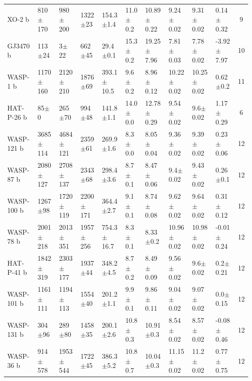 \begin{subappendices}
{\begin{landscape}
\begin{longtable}{llllllllllc}
  XO-2 b        &     810$\pm$170 &     980$\pm$200 &   1322$\pm$23 &    154.3$\pm$1.4 &  11.0$\pm$0.2 &  10.89$\pm$0.22 &   9.24$\pm$0.02 &   9.31$\pm$0.02 &   0.14$\pm$0.32 &        9 \\
  GJ3470 b     &      113$\pm$24 &        3$\pm$22 &    662$\pm$45 &     29.4$\pm$0.1 &  15.3$\pm$0.2 &  19.25$\pm$7.96 &   7.81$\pm$0.03 &   7.78$\pm$0.02 &  -3.92$\pm$7.97 &       10 \\
  WASP-1 b      &    1170$\pm$160 &    2120$\pm$210 &   1876$\pm$69 &   393.1$\pm$10.5 &   9.6$\pm$0.2 &   8.96$\pm$0.12 &  10.22$\pm$0.02 &  10.25$\pm$0.02 &    0.62$\pm$0.2 &       11 \\
  HAT-P-26 b     &        85$\pm$0 &      265$\pm$70 &    994$\pm$48 &    141.8$\pm$1.1 &  14.0$\pm$0.0 &  12.78$\pm$0.29 &   9.54$\pm$0.02 &    9.6$\pm$0.02 &   1.17$\pm$0.29 &        6 \\
  WASP-121 b    &    3685$\pm$114 &    4684$\pm$121 &   2359$\pm$61 &    269.9$\pm$1.6 &   8.3$\pm$0.0 &   8.05$\pm$0.04 &   9.36$\pm$0.02 &   9.39$\pm$0.02 &   0.23$\pm$0.06 &       12 \\
  WASP-87 b     &    2080$\pm$127 &    2708$\pm$137 &   2343$\pm$68 &    298.4$\pm$3.6 &   8.7$\pm$0.1 &   8.47$\pm$0.06 &    9.4$\pm$0.02 &   9.43$\pm$0.02 &    0.26$\pm$0.1 &       12 \\
  WASP-100 b    &     1267$\pm$98 &    1720$\pm$119 &  2200$\pm$171 &    364.4$\pm$2.7 &   9.1$\pm$0.1 &   8.74$\pm$0.08 &   9.62$\pm$0.02 &   9.64$\pm$0.02 &   0.31$\pm$0.12 &       12 \\
  WASP-78 b     &    2001$\pm$218 &    2013$\pm$351 &  1957$\pm$256 &   754.3$\pm$16.7 &   8.3$\pm$0.1 &    8.33$\pm$0.2 &  10.96$\pm$0.02 &  10.98$\pm$0.02 &  -0.01$\pm$0.24 &       12 \\
  HAT-P-41 b     &    1842$\pm$319 &    2303$\pm$177 &   1937$\pm$44 &    348.2$\pm$4.5 &   8.7$\pm$0.2 &   8.49$\pm$0.09 &   9.56$\pm$0.02 &    9.6$\pm$0.02 &    0.2$\pm$0.21 &       12 \\
  WASP-101 b    &    1161$\pm$111 &    1194$\pm$113 &   1554$\pm$40 &    201.2$\pm$1.1 &   9.9$\pm$0.1 &   9.86$\pm$0.11 &   9.04$\pm$0.02 &   9.07$\pm$0.02 &    0.0$\pm$0.15 &       12 \\
  WASP-131 b    &      304$\pm$96 &      289$\pm$80 &   1458$\pm$35 &    200.1$\pm$2.6 &  10.8$\pm$0.3 &   10.91$\pm$0.3 &   8.54$\pm$0.02 &   8.57$\pm$0.02 &  -0.08$\pm$0.46 &       12 \\
  WASP-36 b     &     914$\pm$578 &    1953$\pm$544 &   1722$\pm$45 &    386.3$\pm$5.2 &  10.8$\pm$0.7 &   10.04$\pm$0.3 &  11.15$\pm$0.02 &   11.2$\pm$0.02 &   0.77$\pm$0.75 &       12 \\

\end{longtable}
\end{landscape}}
\end{subappendices}
